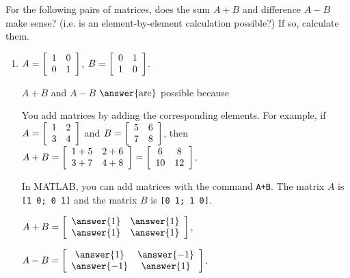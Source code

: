 \documentclass{ximera}
\author{Zack Reed}
\begin{document}
\begin{exercise}
    For the following pairs of matrices, does the sum $A+B$ and difference $A-B$ make sense? (i.e. is an element-by-element calculation possible?) If so, calculate them.
    \begin{enumerate}
    \item
      $A = \startmat{cc}
        1 & 0 \\
        0 & 1
      \stopmat$,\quad
      $B = \startmat{cc}
        0 & 1 \\
        1 & 0
      \stopmat$.
  
      
  
        $A+B$ and $A-B$ $\answer{\text{are}}$ possible because 
  
        \begin{selectAll}
        \end{selectAll}

        \begin{hint}
        
          You add matrices by adding the corresponding elements. For example, if $A = \startmat{cc} 1 & 2 \\ 3 & 4 \stopmat$ and $B = \startmat{cc} 5 & 6 \\ 7 & 8 \stopmat$, then $A+B = \startmat{cc} 1+5 & 2+6 \\ 3+7 & 4+8 \stopmat = \startmat{cc} 6 & 8 \\ 10 & 12 \stopmat$.

          In MATLAB, you can add matrices with the command \texttt{A+B}. The matrix $A$ is \texttt{[1 0; 0 1]} and the matrix $B$ is \texttt{[0 1; 1 0]}.

        \end{hint}
  
        $A+B = \startmat{cc}
          \answer{1} & \answer{1} \\
          \answer{1} & \answer{1}
        \stopmat$,\quad
  
        $A-B = \startmat{cc}
          \answer{1} & \answer{-1} \\
          \answer{-1} & \answer{1}
        \stopmat$.
  

\end{enumerate}
\end{exercise}
\end{document}
